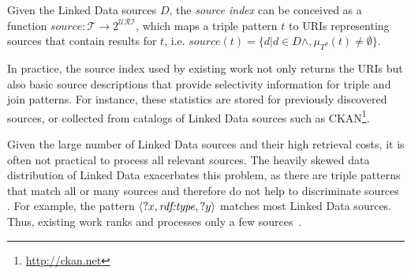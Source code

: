 \begin{definition}
  \label{def:index}
  Given the Linked Data sources $D$, the \emph{source index} can be
  conceived as a function $source : \mathcal{T} \to 2^\mathcal{URI}$,
  which maps a triple pattern $t$ to URIs representing sources that
  contain results for $t$, i.e. $source(t) = \{d| d \in D \wedge,
  \mu_{T^d}(t) \neq \emptyset \}$.
\end{definition}
%

In practice, the source index used by existing work not only returns the URIs but also basic source descriptions that provide selectivity information for triple and join patterns. For instance, these statistics are stored for previously discovered sources, or collected from catalogs of Linked Data sources such as CKAN\footnote{\url{http://ckan.net}}.

Given the large number of Linked Data sources and their high retrieval costs, it is often not practical to process all relevant sources. The heavily skewed data
distribution of Linked Data exacerbates this problem, as there are
triple patterns that match all or many sources and therefore do not
help to discriminate sources \cite{ladwig_linked_2010}. For example, 
the pattern $\langle ?x, \mbox{\emph{rdf:type}}, ?y \rangle$ matches most Linked Data sources. Thus, existing work ranks and processes only a few sources~\cite{harth_data_2010,ladwig_linked_2010}.



